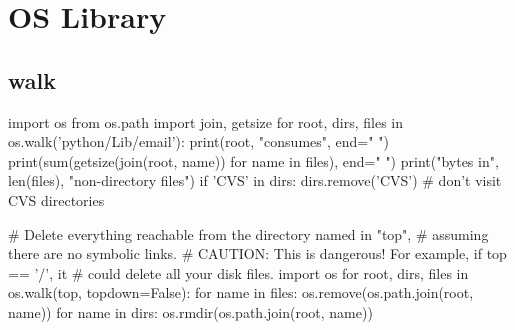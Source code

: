 \documentclass[oneside]{syntexpydoc}
\begin{document}
\section{OS Library}
\subsection{walk}
\begin{python}
import os
from os.path import join, getsize
for root, dirs, files in os.walk('python/Lib/email'):
    print(root, "consumes", end=" ")
    print(sum(getsize(join(root, name)) for name in files), end=" ")
    print("bytes in", len(files), "non-directory files")
    if 'CVS' in dirs:
        dirs.remove('CVS')  # don't visit CVS directories
\end{python}

\begin{python}
# Delete everything reachable from the directory named in "top",
# assuming there are no symbolic links.
# CAUTION:  This is dangerous!  For example, if top == '/', it
# could delete all your disk files.
import os
for root, dirs, files in os.walk(top, topdown=False):
    for name in files:
        os.remove(os.path.join(root, name))
    for name in dirs:
        os.rmdir(os.path.join(root, name))
\end{python}

\pagebreak









\end{document}
